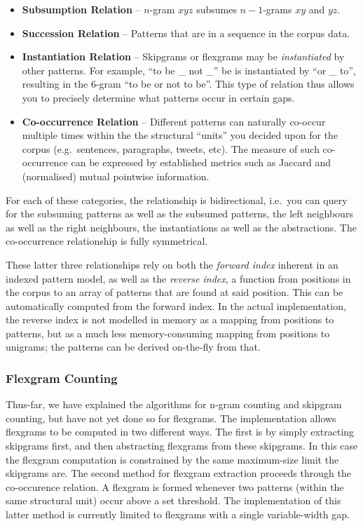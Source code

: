 \documentclass[a4paper,12pt]{article}
\begin{document}
\begin{itemize}
 \item \textbf{Subsumption Relation} -- $n$-gram $x y z$ subsumes $n-1$-grams $x y$ and $y z$. 
 \item \textbf{Succession Relation} -- Patterns that are in a sequence in the corpus data. 
 \item \textbf{Instantiation Relation} -- Skipgrams or flexgrams may be
     \emph{instantiated} by other patterns. For example, ``to be \_ not \_'' be
     is instantiated by ``or \_ to'', resulting in the 6-gram ``to be or not to be''. This type of relation thus allows you to precisely determine what patterns occur in certain gaps.
 \item \textbf{Co-occurrence Relation} -- Different patterns can naturally co-occur multiple times
     within the the structural ``units'' you decided upon for the corpus (e.g.\ 
     sentences, paragraphs, tweets, etc). The measure of such co-occurrence 
     can be expressed by established metrics such as Jaccard and (normalised) mutual
     pointwise information.
\end{itemize}

For each of these categories, the relationship is bidirectional, i.e.\ you can
query for the subsuming patterns as well as the subsumed patterns, the left
neighbours as well as the right neighbours, the instantiations as well as the
abstractions. The co-occurrence relationship is fully symmetrical. 

These latter three relationships rely on both the \emph{forward index} inherent
in an indexed pattern model, as well as the \emph{reverse index}, a function
from positions in the corpus to an array of patterns that are found at said
position. This can be automatically computed from the forward index. In the
actual implementation, the reverse index is not modelled in memory as a mapping from
positions to patterns, but as a much less memory-consuming mapping from
positions to unigrams; the patterns can be derived on-the-fly from that.

\subsubsection{Flexgram Counting}

Thus-far, we have explained the algorithms for n-gram counting and skipgram
counting, but have not yet done so for flexgrams. The implementation allows
flexgrams to be computed in two different ways. The first is by simply
extracting skipgrams first, and then abstracting flexgrams from these
skipgrams. In this case the flexgram computation is constrained by the same
maximum-size limit the skipgrams are. The second method for flexgram extraction
proceeds through the co-occurence relation. A flexgram is formed whenever two
patterns (within the same structural unit) occur above a set threshold. The
implementation of this latter method is currently limited to flexgrams with a
single variable-width gap. 
\end{document}
